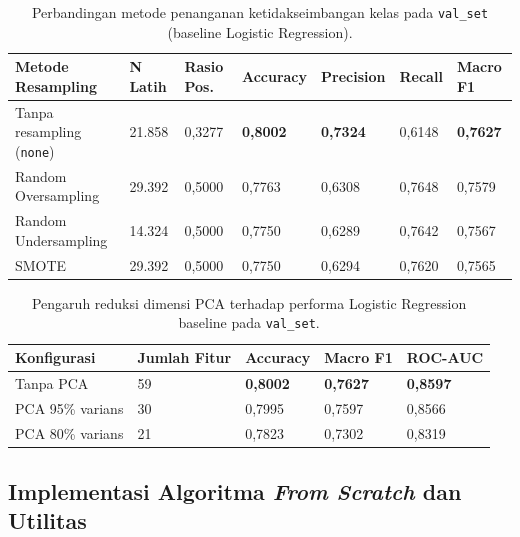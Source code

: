 \documentclass[11pt,a4paper]{article}
\numberwithin{figure}{section}
\numberwithin{table}{section}
\begin{document}
\begin{table}[H]
  \centering
  \small
  \setlength{\tabcolsep}{4pt}
  \caption{Perbandingan metode penanganan ketidakseimbangan kelas pada \texttt{val\_set} (baseline Logistic Regression).}
  \label{tab:resampling}
  \begin{tabularx}{\textwidth}{|Y|R{1.6cm}|R{1.8cm}|R{1.6cm}|R{1.7cm}|R{1.5cm}|R{1.7cm}|}
    \hline
    \textbf{Metode Resampling} & \textbf{N Latih} & \textbf{Rasio Pos.} & \textbf{Accuracy} & \textbf{Precision} & \textbf{Recall} & \textbf{Macro F1} \\
    \hline
    Tanpa resampling (\texttt{none}) & 21.858 & 0,3277 & \textbf{0,8002} & \textbf{0,7324} & 0,6148 & \textbf{0,7627} \\
    \hline
    Random Oversampling & 29.392 & 0,5000 & 0,7763 & 0,6308 & 0,7648 & 0,7579 \\
    \hline
    Random Undersampling & 14.324 & 0,5000 & 0,7750 & 0,6289 & 0,7642 & 0,7567 \\
    \hline
    SMOTE & 29.392 & 0,5000 & 0,7750 & 0,6294 & 0,7620 & 0,7565 \\
    \hline
  \end{tabularx}
\end{table}

\begin{table}[H]
  \centering
  \small
  \setlength{\tabcolsep}{6pt}
  \caption{Pengaruh reduksi dimensi PCA terhadap performa Logistic Regression baseline pada \texttt{val\_set}.}
  \label{tab:pca}
  \begin{tabularx}{\textwidth}{|Y|R{2.4cm}|R{2.2cm}|R{2.2cm}|R{2.2cm}|}
    \hline
    \textbf{Konfigurasi} & \textbf{Jumlah Fitur} & \textbf{Accuracy} & \textbf{Macro F1} & \textbf{ROC-AUC} \\
    \hline
    Tanpa PCA & 59 & \textbf{0,8002} & \textbf{0,7627} & \textbf{0,8597} \\
    \hline
    PCA 95\% varians & 30 & 0,7995 & 0,7597 & 0,8566 \\
    \hline
    PCA 80\% varians & 21 & 0,7823 & 0,7302 & 0,8319 \\
    \hline
  \end{tabularx}
\end{table}

\subsection{Implementasi Algoritma \textit{From Scratch} dan Utilitas}
\end{document}
